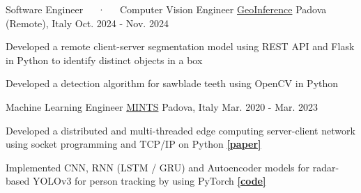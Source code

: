 


\begin{cventries}
  \cventry
    {Software Engineer~~~·~~~Computer Vision Engineer} %
    {\href{https://www.geoinference.com/en/homeeng/}{GeoInference}} %
    {Padova (Remote), Italy} %
    {Oct. 2024 - Nov. 2024} %
    {
      \begin{cvitems} %
        \item {Developed a remote client-server segmentation model using REST API and Flask in Python to identify distinct objects in a box} 
        \item {Developed a detection algorithm for sawblade teeth using OpenCV in Python}
      \end{cvitems}
    }
    
  \cventry
    {Machine Learning Engineer} %
    {\href{https://b5g-mints.eu/}
    {MINTS}} %
    {Padova, Italy} %
    {Mar. 2020 - Mar. 2023} %
    {
      \begin{cvitems} %
        \item {Developed a distributed and multi-threaded edge computing server-client network using socket programming and TCP/IP on Python \href{https://dl.acm.org/doi/abs/10.1145/3565474.3569068}{\textbf{[paper]}}}
        \item {Implemented CNN, RNN (LSTM / GRU) and Autoencoder models for radar-based YOLOv3 for person tracking by using PyTorch \href{https://github.com/enverbashirov/YOLOv3-mMwave-Radar}{\textbf{[code]}}}
      \end{cvitems}
    }


\end{cventries}
